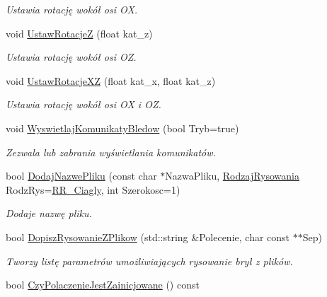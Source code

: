 \begin{DoxyCompactItemize}
\begin{DoxyCompactList}\small\item\em Ustawia rotację wokół osi {\itshape OX}. \end{DoxyCompactList}\item 
void \hyperlink{classPzG_1_1LaczeDoGNUPlota_a458399aa2a8f4b3f00ccd5b272857ea1}{Ustaw\+RotacjeZ} (float kat\+\_\+z)
\begin{DoxyCompactList}\small\item\em Ustawia rotację wokół osi {\itshape OZ}. \end{DoxyCompactList}\item 
void \hyperlink{classPzG_1_1LaczeDoGNUPlota_a94d8527fd78048ed6cb32ffb29e5f903}{Ustaw\+Rotacje\+XZ} (float kat\+\_\+x, float kat\+\_\+z)
\begin{DoxyCompactList}\small\item\em Ustawia rotację wokół osi {\itshape OX} i {\itshape OZ}. \end{DoxyCompactList}\item 
void \hyperlink{classPzG_1_1LaczeDoGNUPlota_a4531e6d166faf2e2c8bb4a54a9c9e1f8}{Wyswietlaj\+Komunikaty\+Bledow} (bool Tryb=true)
\begin{DoxyCompactList}\small\item\em Zezwala lub zabrania wyświetlania komunikatów. \end{DoxyCompactList}\item 
bool \hyperlink{classPzG_1_1LaczeDoGNUPlota_a34bd48f57c0fd69c12bf4127a1cacd8f}{Dodaj\+Nazwe\+Pliku} (const char $\ast$Nazwa\+Pliku, \hyperlink{namespacePzG_a705c92106f39b7d0c34a6739d10ff0b6}{Rodzaj\+Rysowania} Rodz\+Rys=\hyperlink{namespacePzG_a705c92106f39b7d0c34a6739d10ff0b6a927eaa159aa4bd3198f0a330b967746d}{R\+R\+\_\+\+Ciagly}, int Szerokosc=1)
\begin{DoxyCompactList}\small\item\em Dodaje nazwę pliku. \end{DoxyCompactList}\item 
bool \hyperlink{classPzG_1_1LaczeDoGNUPlota_ad3d7607946b82aa941d786dcd086d27e}{Dopisz\+Rysowanie\+Z\+Plikow} (std\+::string \&Polecenie, char const $\ast$$\ast$Sep)
\begin{DoxyCompactList}\small\item\em Tworzy listę parametrów umożliwiających rysowanie brył z plików. \end{DoxyCompactList}\item 
bool \hyperlink{classPzG_1_1LaczeDoGNUPlota_af8be8aeb3b1b524fab67d4411cba5b9e}{Czy\+Polaczenie\+Jest\+Zainicjowane} () const
$$
\end{DoxyCompactItemize}
